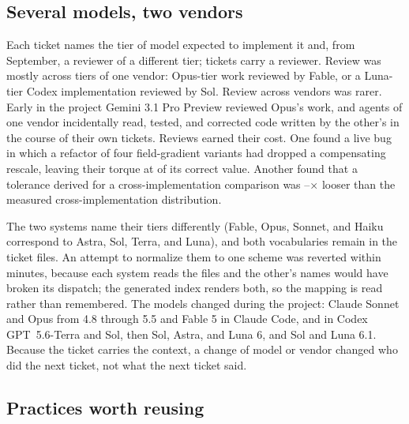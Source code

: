 

\subsection{Several models, two vendors}

Each ticket names the tier of model expected to implement it and, from
September, a reviewer of a different tier; \ReviewedTicketCount{} tickets carry
a reviewer. Review was mostly across tiers of one vendor: Opus-tier work
reviewed by Fable, or a Luna-tier Codex implementation reviewed by Sol. Review
across vendors was rarer. Early in the project Gemini 3.1 Pro Preview reviewed
Opus's work, and agents of one vendor incidentally read, tested, and corrected
code written by the other's in the course of their own tickets. Reviews earned their
cost. One found a live bug in which a refactor of four field-gradient variants
had dropped a compensating rescale, leaving their torque at \ReviewTorqueScale{}
of its correct value. Another found that a tolerance derived for a
cross-implementation comparison was \ReviewToleranceLooseLow--\ReviewToleranceLooseHigh$\times$
looser than the measured cross-implementation distribution.

The two systems name their tiers differently (Fable, Opus, Sonnet, and Haiku
correspond to Astra, Sol, Terra, and Luna), and both vocabularies remain in the
ticket files. An attempt to normalize them to one scheme was reverted within
minutes, because each system reads the files and the other's names would have
broken its dispatch; the generated index renders both, so the mapping is read
rather than remembered. The models changed during the project:
Claude Sonnet and Opus from 4.8 through 5.5 and Fable 5 in Claude Code, and in
Codex GPT~5.6-Terra and Sol, then Sol, Astra, and Luna 6, and Sol and Luna 6.1.
Because the ticket carries the context, a change of model or vendor changed who
did the next ticket, not what the next ticket said.

\subsection{Practices worth reusing}

